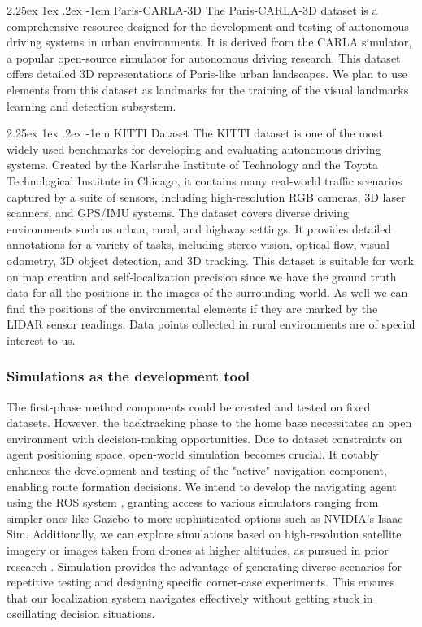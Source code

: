 \documentclass[runningheads]{llncs}
\makeatletter
\renewcommand\paragraph{\@startsection{paragraph}{4}{\z@}%
                                    {2.25ex \@plus1ex \@minus.2ex}%
                                    {-1em}%
                                    {\normalfont\normalsize\bfseries}}
\makeatother
\begin{document}
\paragraph{Paris-CARLA-3D}
The Paris-CARLA-3D dataset is a comprehensive resource designed for the development and testing of autonomous driving systems in urban environments. \cite{ParisCarla3D} It is derived from the CARLA simulator, a popular open-source simulator for autonomous driving research. This dataset offers detailed 3D representations of Paris-like urban landscapes. We plan to use elements from this dataset as landmarks for the training of the visual landmarks learning and detection subsystem.

\paragraph{KITTI Dataset}
The KITTI \cite{Geiger2013IJRR} dataset is one of the most widely used benchmarks for developing and evaluating autonomous driving systems. Created by the Karlsruhe Institute of Technology and the Toyota Technological Institute in Chicago, it contains many real-world traffic scenarios captured by a suite of sensors, including high-resolution RGB cameras, 3D laser scanners, and GPS/IMU systems. The dataset covers diverse driving environments such as urban, rural, and highway settings. It provides detailed annotations for a variety of tasks, including stereo vision, optical flow, visual odometry, 3D object detection, and 3D tracking. This dataset is suitable for work on map creation and self-localization precision since we have the ground truth data for all the positions in the images of the surrounding world. As well we can find the positions of the environmental elements if they are marked by the LIDAR sensor readings. Data points collected in rural environments are of special interest to us.

\subsubsection{Simulations as the development tool}
The first-phase method components could be created and tested on fixed datasets. However, the backtracking phase to the home base necessitates an open environment with decision-making opportunities. Due to dataset constraints on agent positioning space, open-world simulation becomes crucial. It notably enhances the development and testing of the "active" navigation component, enabling route formation decisions.
We intend to develop the navigating agent using the ROS system \cite{ROS2}, granting access to various simulators ranging from simpler ones like Gazebo \cite{Gazebo} to more sophisticated options such as NVIDIA's Isaac Sim.
Additionally, we can explore simulations based on high-resolution satellite imagery or images taken from drones at higher altitudes, as pursued in prior research \cite{GPS-denied-Warren} \cite{gurgu2022vision}.
Simulation provides the advantage of generating diverse scenarios for repetitive testing and designing specific corner-case experiments. This ensures that our localization system navigates effectively without getting stuck in oscillating decision situations.
\end{document}
